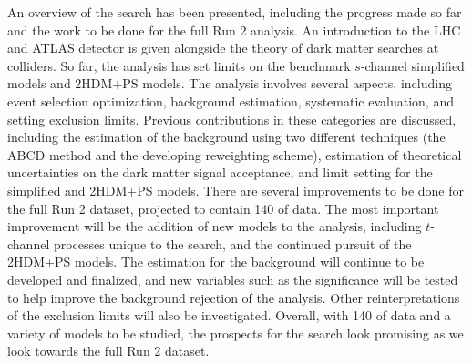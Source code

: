 \label{chapter:conclusions}

An overview of the \monoZ search has been presented, including the progress made so far and the work to be done for the full Run 2 analysis. An introduction to the LHC and ATLAS detector is given alongside the theory of dark matter searches at colliders. So far, the \monoZ analysis has set limits on the benchmark $s$-channel simplified models and 2HDM+PS models. The analysis involves several aspects, including event selection optimization, background estimation, systematic evaluation, and setting exclusion limits. Previous contributions in these categories are discussed, including the estimation of the \Zjets background using two different techniques (the ABCD method and the developing \gjets reweighting scheme), estimation of theoretical uncertainties on the dark matter signal acceptance, and limit setting for the simplified and 2HDM+PS models. There are several improvements to be done for the full Run 2 dataset, projected to contain 140 \ifb of data. The most important improvement will be the addition of new models to the analysis, including $t$-channel processes unique to the \monoZ search, and the continued pursuit of the 2HDM+PS models. The \gjets estimation for the \Zjets background will continue to be developed and finalized, and new variables such as the \etmiss significance will be tested to help improve the background rejection of the analysis. Other reinterpretations of the \monoZ exclusion limits will also be investigated. Overall, with 140 \ifb of data and a variety of models to be studied, the prospects for the \monoZ search look promising as we look towards the full Run 2 dataset.